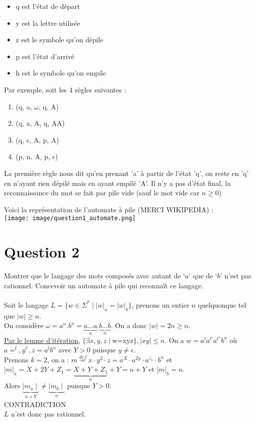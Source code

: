 \documentclass{article}
\begin{document}
    \begin{itemize}
        \item q est l'état de départ
        \item y est la lettre utilisée
        \item z est le symbole qu'on dépile
        \item p est l'état d'arrivé
        \item h est le symbole qu'on empile
    \end{itemize}
    \newpage
    Par exemple, soit les 4 règles suivantes :
    \begin{enumerate}
        \item (q, a, $\omega$, q, A)
        \item (q, a, A, q, AA)
        \item (q, $\epsilon$, A, p, A)
        \item (p, n, A, p, $\epsilon$)
    \end{enumerate}
    
    La première règle nous dit qu'en prenant 'a' à partir de l'état 'q', on reste en 'q' en n'ayant rien dépilé
    mais en ayant empilé 'A'.
    Il n'y a pas d'état final, la reconnaissance du mot se fait par pile vide (sauf le mot vide car $n\geq0$)

    Voici la représentation de l'automate à pile (MERCI WIKIPEDIA) :\\
    
    \texttt{[image: image/question1\_automate.png]}

    \section*{Question 2}
    Montrer que le langage des mots composés avec autant de ‘$a$’ que de ‘$b$’ n’est pas rationnel. Concevoir un automate à pile qui reconnaît ce langage. \\ 
    \\
    Soit le langage $L=\{w \in \Sigma^* \mid \lvert w \rvert_a = \lvert w \rvert_b\}$, prenons un entier $n$ quelquonque tel que $\lvert w \rvert \ge n$. \\
    On considère $\omega=a^{n} . b^{n}=\underbrace{a \ldots a}_{n} . \underbrace{b \ldots b}_{n}$. On a donc $\mid w \mid=2n \ge n$. \\
    \underline{Par le lemme d'itération}, $\{\exists x,y,z \mid $w=xyz$\}, \mid xy \mid \le n$. On a $w=a^la^{l'}a^{l''}b^n$ où $a=^l, y^{l'}, z=a^lb^n$ avec $Y>0$ puisque $y \neq \epsilon$. \\
    Prenons $k=2$, on a : $m \stackrel{d e f}{=} x \cdot y^{2} \cdot z=a^{X} \cdot a^{2 y} \cdot a^{z_{1}} \cdot b^{n}$ et 
    $|m|_{a}=X+2 Y+Z_{1}=\underbrace{X+Y+Z_{1}}_{n}+Y=n+Y \text { et }|m|_{b}=n$. \\
    Alors $\underbrace{\mid m_a \mid}_{n+Y} \neq \underbrace{\mid m_b \mid}_{n}$ puisque $Y>0$. \\
    CONTRADICTION \\
    $L$ n'est donc pas rationnel.
\end{document}
